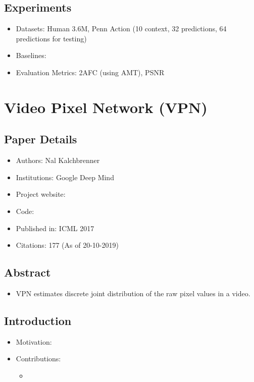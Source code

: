 \documentclass{article}
\begin{document}
    \subsection{Experiments}\label{subsec:Learning_to_Generate_Long_term_Future_via_Hierarchical_Prediction:experiments}
    \begin{itemize}
        \item Datasets: Human 3.6M, Penn Action (10 context, 32 predictions, 64 predictions for testing)
        \item Baselines:
        \item Evaluation Metrics: 2AFC (using AMT), PSNR
    \end{itemize}
    \newpage


    \section{Video Pixel Network (VPN)}\label{sec:Video_Pixel_Network_(VPN)}
    \subsection*{Paper Details}
    \begin{itemize}
        \item Authors: Nal Kalchbrenner
        \item Institutions: Google Deep Mind
        \item Project website:
        \item Code:
        \item Published in: ICML 2017
        \item Citations: 177 (As of 20-10-2019)
    \end{itemize}

    \subsection*{Abstract}
    \begin{itemize}
        \item VPN estimates discrete joint distribution of the raw pixel values in a video.
    \end{itemize}

    \subsection{Introduction}\label{subsec:Video_Pixel_Network_(VPN):introduction}
    \begin{itemize}
        \item Motivation:
        \item Contributions:
        \begin{itemize}
            \item
        \end{itemize}
    \end{itemize}
\end{document}
